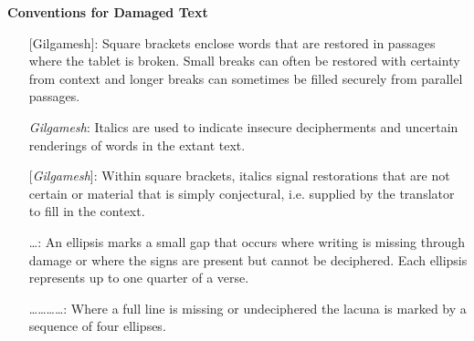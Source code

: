 \documentclass{article}
\begin{document}


\noindent \textbf{Conventions for Damaged Text}

\begin{small}%

\vspace{-0.25em}

\begin{itemize}[
    label=,
    leftmargin=1.5em,
    itemindent=-1.5em,
    itemsep=0.25em,
    parsep=0em
]

    \item[] [Gilgamesh]: Square brackets enclose words that are restored in
passages where the tablet is broken. Small breaks can often be restored
with certainty from context and longer breaks can sometimes be filled
securely from parallel passages. 

    \item[] \textit{Gilgamesh}: Italics are used to indicate insecure decipherments and
uncertain renderings of words in the extant text.

    \item[] [\textit{Gilgamesh}]: Within square brackets, italics signal restorations
that are not certain or material that is simply conjectural, i.e.
supplied by the translator to fill in the context.

    \item[] \dots{}: An ellipsis marks a small gap that occurs where writing is
missing through damage or where the signs are present but cannot be
deciphered. Each ellipsis represents up to one quarter of a verse.

    \item[] \dots\dots\dots\dots: Where a full line is missing or undeciphered the
lacuna is marked by a sequence of four ellipses.


\end{itemize}
\end{small}
\end{document}
